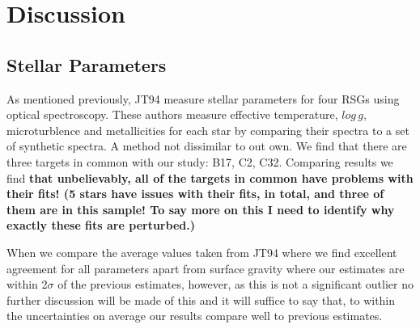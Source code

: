 \documentclass[useAMS,usenatbib]{mn2e}
\begin{document}
\section{Discussion} %
\label{sec:discussion}


\subsection{Stellar Parameters} %
\label{sub:stellar_parameters_disc}
As mentioned previously, JT94 measure stellar parameters for four RSGs using optical spectroscopy.
These authors measure effective temperature, $log\,g$, microturblence and metallicities for each star by comparing their spectra to a set of synthetic spectra.
A method not dissimilar to out own.
We find that there are three targets in common with our study: B17, C2, C32.
Comparing results we find \textbf{that unbelievably, all of the targets in common have problems with their fits! (5 stars have issues with their fits, in total, and three of them are in this sample! To say more on this I need to identify why exactly these fits are perturbed.)}

When we compare the average values taken from JT94 where we find excellent agreement for all parameters apart from surface gravity where our estimates are within 2$\sigma$ of the previous estimates, however, as this is not a significant outlier no further discussion will be made of this and it will suffice to say that, to within the uncertainties on average our results compare well to previous estimates.

\end{document}
